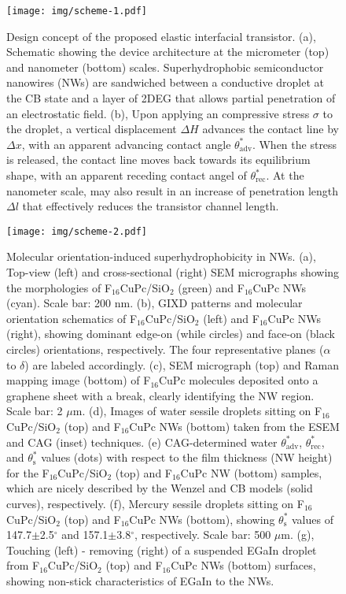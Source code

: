 \documentclass[journal=nalefd,manuscript=letter,email=true,hyperref=true,keywords=true]{achemso}
\begin{document}
\begin{figure}[htbp]
\centering
\texttt{[image: img/scheme-1.pdf]}
\caption{\label{fig:main-1}
Design concept of the proposed elastic interfacial transistor. (a), Schematic showing the device architecture at the micrometer (top) and nanometer (bottom) scales. Superhydrophobic semiconductor nanowires (NWs) are sandwiched between a conductive droplet at the CB state and a layer of 2DEG that allows partial penetration of an electrostatic field. (b), Upon applying an compressive stress \(\sigma\) to the droplet, a vertical displacement \(\Delta H\) advances the contact line by \(\Delta x\), with an apparent advancing contact angle \(\theta_{\mathrm{adv}}^{*}\). When the stress is released, the contact line moves back towards its equilibrium shape, with an apparent receding contact angel of \(\theta_{\mathrm{rec}}^{*}\). At the nanometer scale,  may also result in an increase of penetration length \(\Delta l\) that effectively reduces the transistor channel length.}
\end{figure}


\begin{figure}[htbp]
\centering
\texttt{[image: img/scheme-2.pdf]}
\caption{\label{fig:main-2}
Molecular orientation-induced superhydrophobicity in NWs. (a), Top-view (left) and cross-sectional (right) SEM micrographs showing the morphologies of F\(_{\text{16}}\)CuPc/SiO\(_{\text{2}}\) (green) and F\(_{\text{16}}\)CuPc NWs (cyan). Scale bar: 200 nm. (b), GIXD patterns and molecular orientation schematics of F\(_{\text{16}}\)CuPc/SiO\(_{\text{2}}\) (left) and F\(_{\text{16}}\)CuPc NWs (right), showing dominant edge-on (while circles) and face-on (black circles) orientations, respectively. The four representative planes (\(\alpha\) to \(\delta\)) are labeled accordingly. (c), SEM micrograph (top) and Raman mapping image (bottom) of F\(_{\text{16}}\)CuPc molecules deposited onto a graphene sheet with a break, clearly identifying the NW region. Scale bar: 2 \(\mu\)m. (d), Images of water sessile droplets sitting on F\(_{\text{16}}\)CuPc/SiO\(_{\text{2}}\) (top) and F\(_{\text{16}}\)CuPc NWs (bottom) taken from the ESEM and CAG (inset) techniques. (e) CAG-determined water \(\theta_{\mathrm{adv}}^{*}\), \(\theta_{\mathrm{rec}}^{*}\), and \(\theta_{\mathrm{s}}^{*}\) values (dots) with respect to the film thickness (NW height) for the F\(_{\text{16}}\)CuPc/SiO\(_{\text{2}}\) (top) and F\(_{\text{16}}\)CuPc NW (bottom) samples, which are nicely described by the Wenzel and CB models (solid curves), respectively. (f), Mercury sessile droplets sitting on F\(_{\text{16}}\)CuPc/SiO\(_{\text{2}}\) (top) and F\(_{\text{16}}\)CuPc NWs (bottom), showing \(\theta_{\mathrm{s}}^{*}\) values of 147.7\(\pm\)2.5\(^{\circ}\)  and 157.1\(\pm\)3.8\(^{\circ}\), respectively. Scale bar: 500 \(\mu\)m. (g), Touching (left) - removing (right) of a suspended EGaIn droplet from F\(_{\text{16}}\)CuPc/SiO\(_{\text{2}}\) (top) and F\(_{\text{16}}\)CuPc NWs (bottom) surfaces, showing non-stick characteristics of EGaIn to the NWs.}
\end{figure}
\end{document}

